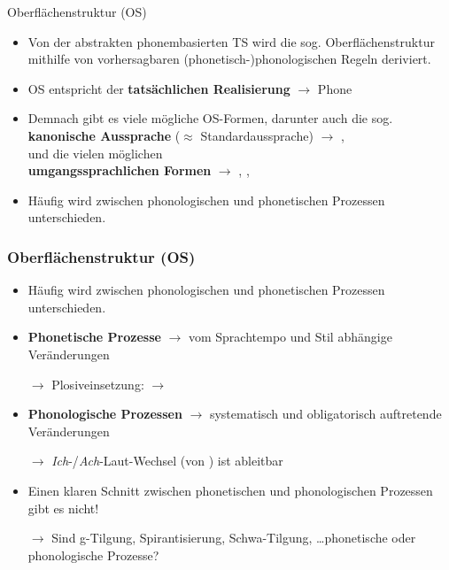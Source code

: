 \begin{frame}{Oberflächenstruktur (OS)}

\begin{itemize}
	\item Von der abstrakten phonembasierten TS wird die sog. Oberflächenstruktur mithilfe von vorhersagbaren (phonetisch-)phonologischen Regeln deriviert.
	\item[]
	\item OS entspricht der \textbf{tatsächlichen Realisierung} $\rightarrow$ Phone \textipa{[ ]}
	\item[]
	\item Demnach gibt es viele mögliche OS-Formen, darunter auch die sog.\\ 
\textbf{kanonische Aussprache} ($\approx$ Standardaussprache) $\rightarrow$ \textipa{[P e: b @ n]},\\
und die vielen möglichen\\
\textbf{umgangssprachlichen Formen} $\rightarrow$ \textipa{[P e: b n]}, \textipa{[P e: b m]}, \textipa{[P e: m]}
	\item[]
	\item Häufig wird zwischen phonologischen und phonetischen Prozessen unterschieden.
\end{itemize}

\end{frame}




\begin{frame}
\frametitle{{Oberflächenstruktur (OS)}}

\begin{itemize}
	\item Häufig wird zwischen phonologischen und phonetischen Prozessen unterschieden.
	\item[]
	\item \textbf{Phonetische Prozesse} $\rightarrow$ vom Sprachtempo und Stil abhängige Veränderungen
	\item[$\rightarrow$] Plosiveinsetzung:  $\rightarrow$ \textipa{[P a m p t]}
	\item[]
	\item \textbf{Phonologische Prozessen} $\rightarrow$ systematisch und obligatorisch auftretende Veränderungen
	\item[$\rightarrow$] \textit{Ich}-/\textit{Ach}-Laut-Wechsel \textipa{[b u: x]} (von ) ist ableitbar
	\item[]
	\item Einen klaren Schnitt zwischen phonetischen und phonologischen Prozessen gibt es nicht!
	\item[$\rightarrow$] Sind g-Tilgung, Spirantisierung, Schwa-Tilgung, \dots phonetische oder phonologische Prozesse?
\end{itemize}

\end{frame}




